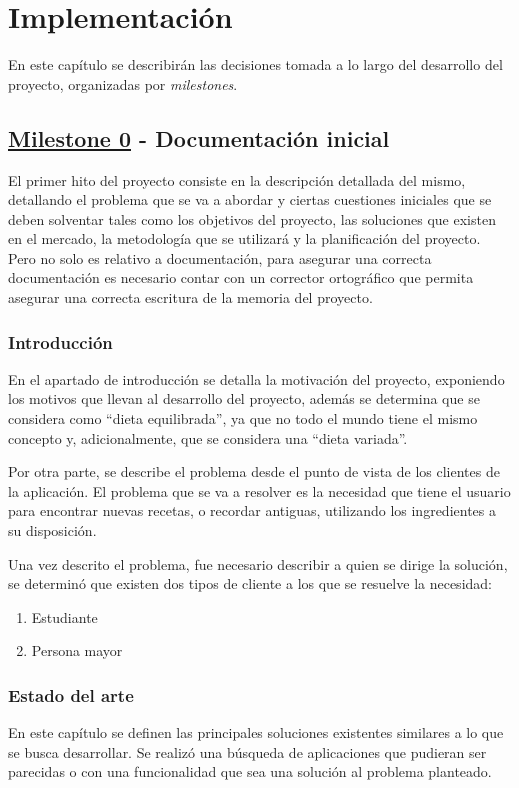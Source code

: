 \chapter{Implementación}
En este capítulo se describirán las decisiones tomada a lo largo del desarrollo del proyecto, organizadas por \emph{milestones}. 

\section{\href{https://github.com/Slowmybrosh/TFG-DietPlanner/milestone/1}{Milestone 0} - Documentación inicial}
El primer hito del proyecto consiste en la descripción detallada del mismo, detallando el problema que se va a abordar y ciertas cuestiones iniciales que se deben solventar tales como los objetivos del proyecto, las soluciones que existen en el mercado, la metodología que se utilizará y la planificación del proyecto. Pero no solo es relativo a documentación, para asegurar una correcta documentación es necesario contar con un corrector ortográfico que permita asegurar una correcta escritura de la memoria del proyecto.

\subsection{Introducción}
En el apartado de introducción se detalla la motivación del proyecto, exponiendo los motivos que llevan al desarrollo del proyecto, además se determina que se considera como ``dieta equilibrada'', ya que no todo el mundo tiene el mismo concepto y, adicionalmente, que se considera una ``dieta variada''. 

Por otra parte, se describe el problema desde el punto de vista de los clientes de la aplicación. El problema que se va a resolver es la necesidad que tiene el usuario para encontrar nuevas recetas, o recordar antiguas, utilizando los ingredientes a su disposición. 

Una vez descrito el problema, fue necesario describir a quien se dirige la solución, se determinó que existen dos tipos de cliente a los que se resuelve la necesidad:
\begin{enumerate}
    \item Estudiante
    \item Persona mayor
\end{enumerate}

\subsection{Estado del arte}
En este capítulo se definen las principales soluciones existentes similares a lo que se busca desarrollar. Se realizó una búsqueda de aplicaciones que pudieran ser parecidas o con una funcionalidad que sea una solución al problema planteado. 


